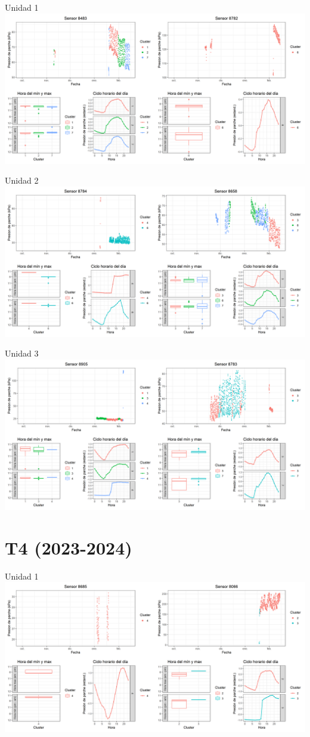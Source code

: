 \documentclass[
  letterpaper,
  DIV=11,
  numbers=noendperiod]{scrreprt}
\begin{document}
Unidad 1
\includegraphics{figuras/02_turgor_limpiado/2023_2024_Rio_Claro_T3_Unidad_1.png}

Unidad 2
\includegraphics{figuras/02_turgor_limpiado/2023_2024_Rio_Claro_T3_Unidad_2.png}

Unidad 3
\includegraphics{figuras/02_turgor_limpiado/2023_2024_Rio_Claro_T3_Unidad_3.png}

\chapter{T4 (2023-2024)}

Unidad 1
\includegraphics{figuras/02_turgor_limpiado/2023_2024_Rio_Claro_T4_Unidad_1.png}
\end{document}
